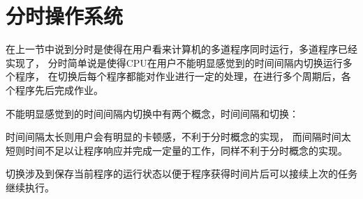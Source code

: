 \section{分时操作系统}

在上一节中说到分时是使得在用户看来计算机的多道程序同时运行，多道程序已经实现了，
分时简单说是使得CPU在用户不能明显感觉到的时间间隔内切换运行多个程序，
在切换后每个程序都能对作业进行一定的处理，在进行多个周期后，各个程序先后完成作业。

不能明显感觉到的时间间隔内切换中有两个概念，时间间隔和切换：

时间间隔太长则用户会有明显的卡顿感，不利于分时概念的实现，
而间隔时间太短则时间不足以让程序响应并完成一定量的工作，同样不利于分时概念的实现。

切换涉及到保存当前程序的运行状态以便于程序获得时间片后可以接续上次的任务继续执行。

